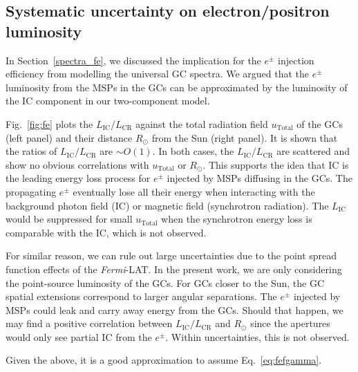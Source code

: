 \documentclass[doublespace,nopageskip]{VTthesis} %
\begin{document}
\subsection{Systematic uncertainty on electron/positron luminosity }\label{appx:system_fe}

In Section~\ref{spectra_fe}, we discussed the implication for the $e^\pm$ injection efficiency from modelling the universal GC spectra. We argued that the $e^\pm$ luminosity from the MSPs in the GCs can be approximated by the luminosity of the IC component in our two-component model. 

Fig.~\ref{fig:fe} plots the $L_\mathrm{IC}/L_\mathrm{CR}$ against the total radiation field $u_\mathrm{Total}$ of the GCs (left panel) and their distance $R_\odot$ from the Sun (right panel). It is shown that the ratios of $L_\mathrm{IC}/L_\mathrm{CR}$ are $\sim O(1)$. In both cases, the $L_\mathrm{IC}/L_\mathrm{CR}$ are scattered and show no obvious correlations with $u_\mathrm{Total}$ or $R_\odot$. This supports the idea that IC is the leading energy loss process for $e^\pm$ injected by MSPs diffusing in the GCs. The propagating $e^\pm$ eventually lose all their energy when interacting with the background photon field (IC) or magnetic field (synchrotron radiation). The $L_\mathrm{IC}$ would be suppressed for small $u_\mathrm{Total}$ when the synchrotron energy loss is comparable with the IC, which is not observed. 

For similar reason, we can rule out large uncertainties due to the point spread function effects of the \textit{Fermi}-LAT. In the present work, we are only considering the point-source luminosity of the GCs. For GCs closer to the Sun, the GC spatial extensions correspond to larger angular separations. The $e^\pm$ injected by MSPs could leak and carry away energy from the GCs. Should that happen, we may find a positive correlation between $L_\mathrm{IC}/L_\mathrm{CR}$ and $R_\odot$ since the apertures would only see partial IC from the $e^\pm$. Within uncertainties, this is not observed.

Given the above, it is a good approximation to assume Eq.~\ref{eq:fefgamma}.
\end{document}
